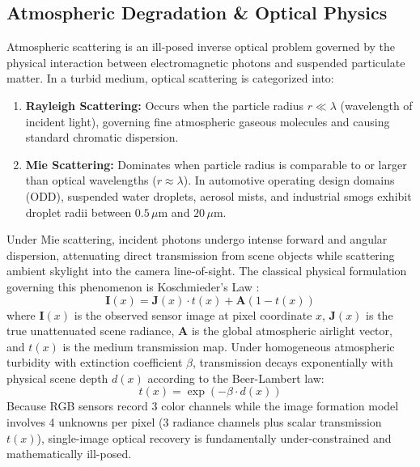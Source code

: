 \documentclass[conference]{IEEEtran}
\begin{document}
\subsection{Atmospheric Degradation \& Optical Physics}
Atmospheric scattering is an ill-posed inverse optical problem governed by the physical interaction between electromagnetic photons and suspended particulate matter. In a turbid medium, optical scattering is categorized into:
\begin{enumerate}
    \item \textbf{Rayleigh Scattering:} Occurs when the particle radius $r \ll \lambda$ (wavelength of incident light), governing fine atmospheric gaseous molecules and causing standard chromatic dispersion.
    \item \textbf{Mie Scattering:} Dominates when particle radius is comparable to or larger than optical wavelengths ($r \approx \lambda$). In automotive operating design domains (ODD), suspended water droplets, aerosol mists, and industrial smogs exhibit droplet radii between $0.5\,\mu\text{m}$ and $20\,\mu\text{m}$.
\end{enumerate}
Under Mie scattering, incident photons undergo intense forward and angular dispersion, attenuating direct transmission from scene objects while scattering ambient skylight into the camera line-of-sight. The classical physical formulation governing this phenomenon is Koschmieder's Law \cite{koschmieder1924theorie}:
\begin{equation}
\mathbf{I}(x) = \mathbf{J}(x) \cdot t(x) + \mathbf{A}(1 - t(x))
\label{eq:koschmieder}
\end{equation}
where $\mathbf{I}(x)$ is the observed sensor image at pixel coordinate $x$, $\mathbf{J}(x)$ is the true unattenuated scene radiance, $\mathbf{A}$ is the global atmospheric airlight vector, and $t(x)$ is the medium transmission map. Under homogeneous atmospheric turbidity with extinction coefficient $\beta$, transmission decays exponentially with physical scene depth $d(x)$ according to the Beer-Lambert law:
\begin{equation}
t(x) = \exp(-\beta \cdot d(x))
\label{eq:beer_lambert}
\end{equation}
Because RGB sensors record 3 color channels while the image formation model involves 4 unknowns per pixel (3 radiance channels plus scalar transmission $t(x)$), single-image optical recovery is fundamentally under-constrained and mathematically ill-posed.
\end{document}
